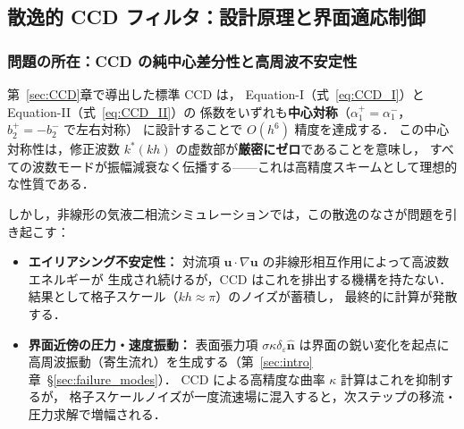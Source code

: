 %
%

\subsection{散逸的 CCD フィルタ：設計原理と界面適応制御}
\label{sec:dissipative_ccd}

\subsubsection{問題の所在：CCD の純中心差分性と高周波不安定性}
\label{sec:dccd_motivation}

第~\ref{sec:CCD}章で導出した標準 CCD は，
Equation-I（式~\eqref{eq:CCD_I}）と Equation-II（式~\eqref{eq:CCD_II}）の
係数をいずれも\textbf{中心対称}（$\alpha_1^+ = \alpha_1^-$，$b_2^+ = -b_2^-$ で左右対称）
に設計することで $O(h^6)$ 精度を達成する．
この中心対称性は，修正波数 $k^*(kh)$ の虚数部が\textbf{厳密にゼロ}であることを意味し，
すべての波数モードが振幅減衰なく伝播する——これは高精度スキームとして理想的な性質である．

しかし，非線形の気液二相流シミュレーションでは，この散逸のなさが問題を引き起こす：
\begin{itemize}
  \item \textbf{エイリアシング不安定性：}
        対流項 $\bm{u}\cdot\nabla\bm{u}$ の非線形相互作用によって高波数エネルギーが
        生成され続けるが，CCD はこれを排出する機構を持たない．
        結果として格子スケール（$kh \approx \pi$）のノイズが蓄積し，
        最終的に計算が発散する．
  \item \textbf{界面近傍の圧力・速度振動：}
        表面張力項 $\sigma\kappa\delta_\varepsilon\hat{\bm{n}}$ は界面の鋭い変化を起点に
        高周波振動（寄生流れ）を生成する（第~\ref{sec:intro}章~§\ref{sec:failure_modes}）．
        CCD による高精度な曲率 $\kappa$ 計算はこれを抑制するが，
        格子スケールノイズが一度流速場に混入すると，次ステップの移流・圧力求解で増幅される．
\end{itemize}

